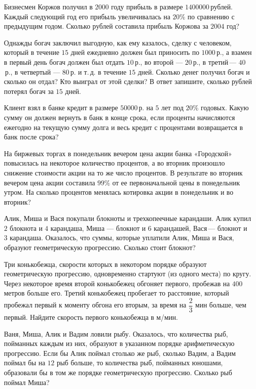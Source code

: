 \begin{class}[number=2]
	\begin{listofex}
		\item Бизнесмен Коржов получил в \( 2000 \) году прибыль в размере \( 1 400 000 \) рублей. Каждый следующий год его прибыль увеличивалась на \( 20\% \) по сравнению с предыдущим годом. Сколько рублей составила прибыль Коржова за \( 2004 \) год?
		\item Однажды богач заключил выгодную, как ему казалось, сделку с человеком, который в течение \( 15 \) дней ежедневно должен был приносить по \( 1000 \) р., а взамен в первый день богач должен был отдать \( 10 \) р., во второй --- \( 20 \) р., в третий --- \( 40 \) р., в четвертый --- \( 80 \) р. и т. д. в течение \( 15 \) дней. Сколько денег получил богач и сколько он отдал? Кто выиграл от этой сделки? В ответ запишите, сколько рублей потерял богач за \( 15 \) дней.
		\item Клиент взял в банке кредит в размере \( 50 000 \) р. на \( 5 \) лет под \( 20\% \) годовых. Какую сумму он должен вернуть в банк в конце срока, если проценты начисляются ежегодно на текущую сумму долга и весь кредит с процентами возвращается в банк после срока?
		\item На биржевых торгах в понедельник вечером цена акции банка «Городской» повысилась на некоторое количество процентов, а во вторник произошло снижение стоимости акции на то же число процентов. В результате во вторник вечером цена акции составила \( 99\% \) от ее первоначальной цены в понедельник утром. На сколько процентов менялась котировка акции в понедельник и во вторник?
		\item Алик, Миша и Вася покупали блокноты и трехкопеечные карандаши. Алик купил \( 2 \) блокнота и \( 4 \) карандаша, Миша --- блокнот и \( 6 \) карандашей, Вася --- блокнот и \( 3 \) карандаша. Оказалось, что суммы, которые уплатили Алик, Миша и Вася, образуют геометрическую прогрессию. Сколько стоит блокнот?
		\item Три конькобежца, скорости которых в некотором порядке образуют геометрическую прогрессию, одновременно стартуют (из одного места) по кругу. Через некоторое время второй конькобежец обгоняет первого, пробежав на \( 400 \) метров больше его. Третий конькобежец пробегает то расстояние, который пробежал первый к моменту обгона его вторым, за время на \( \dfrac{2}{3} \) мин больше, чем первый. Найдите скорость первого конькобежца в м/мин.
		\item Ваня, Миша, Алик и Вадим ловили рыбу. Оказалось, что количества рыб, пойманных каждым из них, образуют в указанном порядке арифметическую прогрессию. Если бы Алик поймал столько же рыб, сколько Вадим, а Вадим поймал бы на \( 12 \) рыб больше, то количества рыб, пойманных юношами, образовали бы в том же порядке геометрическую прогрессию. Сколько рыб поймал Миша?

\end{listofex}
\end{class}
